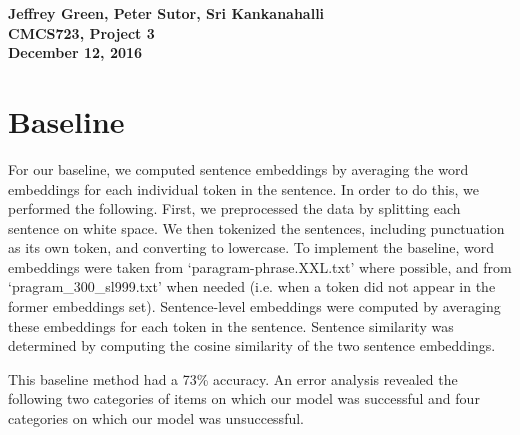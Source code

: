 \documentclass{article}
\begin{document}
\thispagestyle{empty}
\noindent
\textbf{Jeffrey Green, Peter Sutor, Sri Kankanahalli\\CMCS723, Project 3\\December 12, 2016}\\

\section{Baseline}
For our baseline, we computed sentence embeddings by averaging the word embeddings for each individual token in the sentence. In order to do this, we performed the following. First, we preprocessed the data by splitting each sentence on white space. We then tokenized the sentences, including punctuation as its own token, and converting to lowercase. To implement the baseline, word embeddings were taken from `paragram-phrase.XXL.txt' where possible, and from `pragram\_300\_sl999.txt' when needed (i.e. when a token did not appear in the former embeddings set). Sentence-level embeddings were computed by averaging these embeddings for each token in the sentence. Sentence similarity was determined by computing the cosine similarity of the two sentence embeddings.

This baseline method had a 73\% accuracy. An error analysis revealed the following two categories of items on which our model was successful and four categories on which our model was unsuccessful.\\
\end{document}
